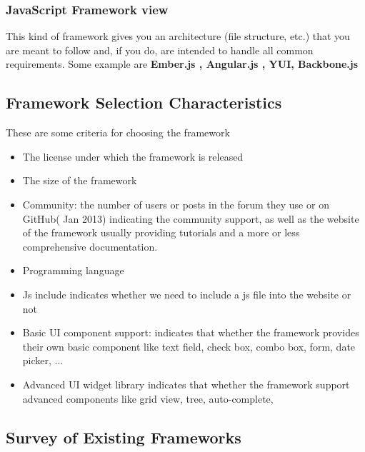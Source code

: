 \documentclass[14pt,a4paper]{extreport}
\begin{document}
		\subsubsection{JavaScript Framework view}
			This kind of framework gives you an architecture (file structure, etc.) that you are meant to follow and, if you do, are intended to handle all common requirements. Some example are \textbf{Ember.js , Angular.js , YUI, Backbone.js}
		
		\subsection{Framework Selection Characteristics}
		These are some criteria for choosing the framework
		\begin{itemize}
			\item The license under which the framework is released
			\item The size of the framework
			\item Community: the number of users or posts in the forum they use or on GitHub( Jan 2013) indicating the community support, as well as the website of the framework usually providing tutorials and a more or less comprehensive documentation.
			\item Programming language
			\item Js include indicates whether we need to include a js file into the website or not
			\item Basic UI component support: indicates that whether the framework provides their own basic component like text field, check box, combo box, form, date picker, ...
			\item Advanced UI widget library indicates that whether the framework support advanced components like grid view, tree, auto-complete, 
			
		\end{itemize}
		\subsection{Survey of Existing Frameworks}
\end{document}
